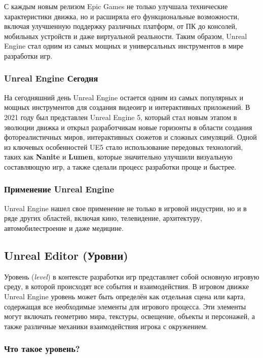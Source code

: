 С каждым новым релизом Epic Games не только улучшала технические характеристики движка, но и расширяла его функциональные возможности, включая улучшенную поддержку различных платформ, от ПК до консолей, мобильных устройств и даже виртуальной реальности. Таким образом, Unreal Engine стал одним из самых мощных и универсальных инструментов в мире разработки игр. \newline

\subsubsection{Unreal Engine Сегодня}
На сегодняшний день Unreal Engine остается одним из самых популярных и мощных инструментов для создания видеоигр и интерактивных приложений. В 2021 году был представлен Unreal Engine 5, который стал новым этапом в эволюции движка и открыл разработчикам новые горизонты в области создания фотореалистичных миров, интерактивных сюжетов и сложных симуляций. Одной из ключевых особенностей UE5 стало использование передовых технологий, таких как \textbf{Nanite} и \textbf{Lumen}, которые значительно улучшили визуальную составляющую игр, а также сделали процесс разработки проще и быстрее.

\subsubsection{Применение Unreal Engine}
Unreal Engine нашел свое применение не только в игровой индустрии, но и в ряде других областей, включая кино, телевидение, архитектуру, автомобилестроение и даже медицине.

\subsection{Unreal Editor (Уровни)}

Уровень (\textit{level}) в контексте разработки игр представляет собой основную игровую среду, в которой происходят все события и взаимодействия. В игровом движке Unreal Engine уровень может быть определён как отдельная сцена или карта, содержащая все необходимые элементы для игрового процесса. Эти элементы могут включать геометрию мира, текстуры, освещение, объекты и персонажей, а также различные механики взаимодействия игрока с окружением.

\subsubsection{Что такое уровень?}

